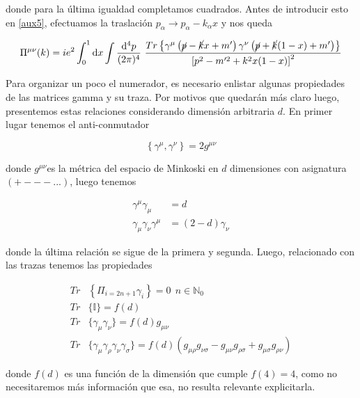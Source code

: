 \documentclass[tickz]{article}
\numberwithin{equation}{section}
\begin{document}
donde para la última igualdad completamos cuadrados. Antes de introducir esto en \ref{aux5}, efectuamos la traslación $ p_{\alpha} \longrightarrow p_{\alpha} - k_{\alpha}x $ y nos queda

\begin{equation}\label{aux6}
\Pi^{\mu\nu}(k) = i e^2 \int_0^1 \mathrm{d}x \int \frac{\mathrm{d^4}p}{(2\pi)^4} \ \frac{Tr\left\{ \gamma^{\mu}\left(\cancel{p}-\cancel{k}x +m'\right)\gamma^{\nu}\left(\cancel{p}+\cancel{k}(1-x)+m'\right) \right\}}{\left[p^2 -m'^2 + k^2x(1-x)\right]^2}   
\end{equation}

Para organizar un poco el numerador, es necesario enlistar algunas propiedades de las matrices gamma y su traza. Por motivos que quedarán más claro luego, presentemos estas relaciones considerando dimensión arbitraria $ d $. En primer lugar tenemos el anti-conmutador

\begin{equation}\label{gamma1}
\left\{\gamma^{\mu},\gamma^{\nu}\right\}=2g^{\mu\nu}
\end{equation} 

donde $ g^{\mu\nu} $es la métrica del espacio de Minkoski en $ d $ dimensiones con asignatura $ (+---...) $, luego tenemos

\begin{equation}\label{gamma2}
\begin{aligned}
\gamma^{\mu}\gamma_{\mu}&=d\\
\gamma_{\mu}\gamma_{\nu}\gamma^{\mu}&=(2-d)\gamma_{\nu}
\end{aligned}
\end{equation} 

donde la última relación se sigue de la primera y segunda. Luego, relacionado con las trazas tenemos las propiedades

\begin{equation}\label{gamma3}
\begin{aligned}
Tr&\left\{\Pi_{i=2n+1}\gamma_i\right\}=0 \ \ n\in \mathbb{N}_0\\
Tr&\{\mathbb{I}\}=f(d)\\
Tr&\{\gamma_{\mu}\gamma_{\nu}\}=f(d)g_{\mu\nu}\\
Tr&\{\gamma_{\mu}\gamma_{\rho}\gamma_{\nu}\gamma_{\sigma}\}=f(d)\left(g_{\mu\rho}g_{\nu\sigma}-g_{\mu\nu}g_{\rho\sigma}+g_{\mu\sigma}g_{\rho\nu}\right)
\end{aligned}
\end{equation}

donde $ f(d) $ es una función de la dimensión que cumple $ f(4)=4 $, como no necesitaremos más información que esa, no resulta relevante explicitarla.\\
\end{document}

